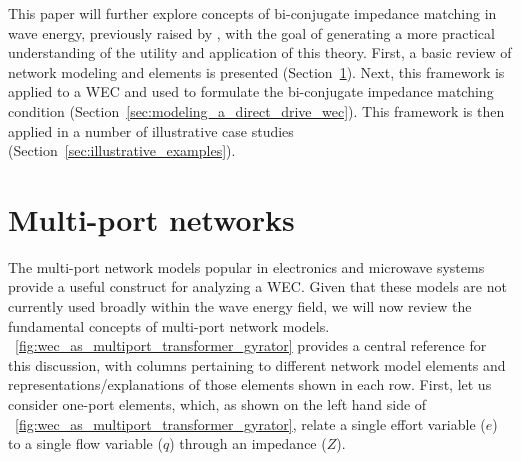 \documentclass[twocolumn]{autart}
\begin{document}
This paper will further explore concepts of bi-conjugate impedance matching in wave energy, previously raised by \cite{Bacelli:2021aa}, with the goal of generating a more practical understanding of the utility and application of this theory. 
First, a basic review of network modeling and elements is presented (Section~\ref{sec:multi_port_networks}).
Next, this framework is applied to a WEC and used to formulate the bi-conjugate impedance matching condition (Section~\ref{sec:modeling_a_direct_drive_wec}).
This framework is then applied in a number of illustrative case studies (Section~\ref{sec:illustrative_examples}).

\section{Multi-port networks}\label{sec:multi_port_networks}
The multi-port network models popular in electronics and microwave systems~\cite{Marrocco:2008aa,CircuitFundamental} provide a useful construct for analyzing a WEC.
Given that these models are not currently used broadly within the wave energy field, we will now review the fundamental concepts of multi-port network models.
\figurename~\ref{fig:wec_as_multiport_transformer_gyrator} provides a central reference for this discussion, with columns pertaining to different network model elements and representations/explanations of those elements shown in each row.
First, let us consider one-port elements, which, as shown on the left hand side of \figurename~\ref{fig:wec_as_multiport_transformer_gyrator}, relate a single effort variable ($e$) to a single flow variable ($q$) through an impedance ($Z$).
\end{document}
